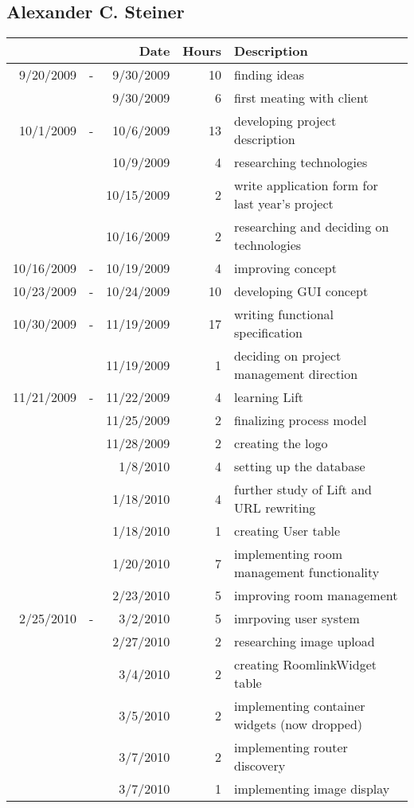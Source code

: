 \subsection{Alexander C. Steiner}
\begin{tabular}{| r c r | r | l |}
\hline
& & Date & Hours & Description \\
\hline
9/20/2009	&	-	&	9/30/2009	&	10	&	finding ideas \\
	&		&	9/30/2009	&	6	&	first meating with client \\
10/1/2009	&	-	&	10/6/2009	&	13	&	developing project description \\
	&		&	10/9/2009	&	4	&	researching technologies \\
	&		&	10/15/2009	&	2	&	write application form for last year's project\\
	&		&	10/16/2009	&	2	&	researching and deciding on technologies \\
10/16/2009	&	-	&	10/19/2009	&	4	&	improving concept \\
10/23/2009	&	-	&	10/24/2009	&	10	&	developing GUI concept \\
10/30/2009	&	-	&	11/19/2009	&	17	&	writing functional specification \\
	&		&	11/19/2009	&	1	&	deciding on project management direction \\
11/21/2009	&	-	&	11/22/2009	&	4	&	learning Lift \\
	&		&	11/25/2009	&	2	&	finalizing process model \\
	&		&	11/28/2009	&	2	&	creating the logo \\
	&		&	1/8/2010	&	4	&	setting up the database \\
	&		&	1/18/2010	&	4	&	further study of Lift and URL rewriting \\
	&		&	1/18/2010	&	1	&	creating User table \\
	&		&	1/20/2010	&	7	&	implementing room management functionality \\
	&		&	2/23/2010	&	5	&	improving room management \\
2/25/2010	&	-	&	3/2/2010	&	5	&	imrpoving user system \\
	&		&	2/27/2010	&	2	&	researching image upload \\
	&		&	3/4/2010	&	2	&	creating RoomlinkWidget table \\
	&		&	3/5/2010	&	2	&	implementing container widgets (now dropped)\\
	&		&	3/7/2010	&	2	&	implementing router discovery \\
	&		&	3/7/2010	&	1	&	implementing image display \\

\end{tabular}
